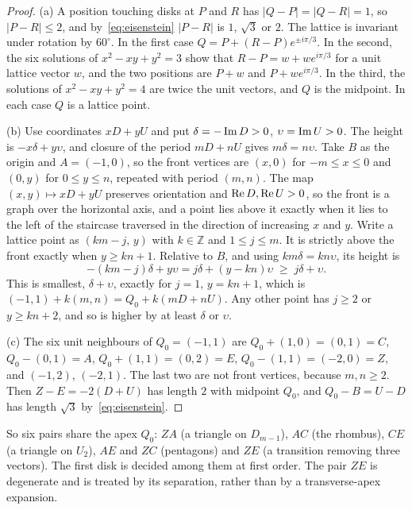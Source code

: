 \begin{proof}
(a) A position touching disks at $P$ and $R$ has $|Q-P|=|Q-R|=1$, so $|P-R|\le2$, and
by~\eqref{eq:eisenstein} $|P-R|$ is $1$, $\sqrt3$ or $2$. The lattice is invariant under rotation by
$60^\circ$. In the first case $Q=P+(R-P)e^{\pm i\pi/3}$. In the second, the six solutions
of $x^2-xy+y^2=3$ show that $R-P=w+we^{i\pi/3}$ for a unit lattice vector $w$, and the two positions are
$P+w$ and $P+we^{i\pi/3}$. In the third, the solutions of $x^2-xy+y^2=4$ are twice the unit vectors, and
$Q$ is the midpoint. In each case $Q$ is a lattice point.

(b) Use coordinates $xD+yU$ and put $\delta=-\operatorname{Im} D>0$, $\upsilon=\operatorname{Im} U>0$. The height is
$-x\delta+y\upsilon$, and closure of the period $mD+nU$ gives $m\delta=n\upsilon$. Take $B$ as the origin and
$A=(-1,0)$, so the front vertices are $(x,0)$ for $-m\le x\le0$ and $(0,y)$ for $0\le y\le n$, repeated
with period $(m,n)$. The map $(x,y)\mapsto xD+yU$ preserves orientation and $\operatorname{Re} D,\operatorname{Re} U>0$, so the front is a
graph over the horizontal axis, and a point lies above it exactly when it lies to the left of the
staircase traversed in the direction of increasing $x$ and $y$. Write a lattice point as
$(km-j,\,y)$ with $k\in\mathbb Z$ and $1\le j\le m$. It is strictly above the front exactly when
$y\ge kn+1$. Relative to $B$, and using $km\delta=kn\upsilon$, its height is
\[
-(km-j)\delta+y\upsilon=j\delta+(y-kn)\upsilon\;\ge\;j\delta+\upsilon .
\]
This is smallest, $\delta+\upsilon$, exactly for $j=1$, $y=kn+1$, which is
$(-1,1)+k(m,n)=Q_0+k(mD+nU)$. Any other point has $j\ge2$ or $y\ge kn+2$, and so is higher by at least
$\delta$ or $\upsilon$.

(c) The six unit neighbours of $Q_0=(-1,1)$ are $Q_0+(1,0)=(0,1)=C$, $Q_0-(0,1)=A$,
$Q_0+(1,1)=(0,2)=E$, $Q_0-(1,1)=(-2,0)=Z$, and $(-1,2)$, $(-2,1)$. The last two are not front vertices,
because $m,n\ge2$. Then $Z-E=-2(D+U)$ has length $2$ with midpoint $Q_0$, and $Q_0-B=U-D$ has length
$\sqrt3$ by~\eqref{eq:eisenstein}.
\end{proof}

\noindent So six pairs share the apex $Q_0$: $ZA$ (a triangle on $D_{m-1}$), $AC$ (the rhombus), $CE$ (a
triangle on $U_2$), $AE$ and $ZC$ (pentagons) and $ZE$ (a transition removing three vectors). The first
disk is decided among them at first order. The pair $ZE$ is degenerate and is treated by
its separation, rather than by a transverse-apex expansion.

